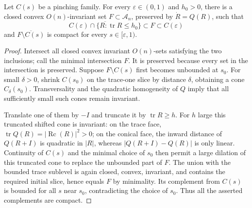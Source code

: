 \begin{theorem}
  \label{thm:chow-ii-generalized-pinching-set}
  Let \(C(s)\) be a pinching family.  For every \(\varepsilon\in(0,1)\) and
  \(h_0>0\), there is a closed convex \(O(n)\)-invariant set
  \(F\subset\mathcal A_n\), preserved by \(\dot R=Q(R)\), such that
  \[
  \overline{C(\varepsilon)\cap\{R:\operatorname{tr}R\le h_0\}}
  \subset F\subset C(\varepsilon)
  \]
  and \(\overline{F\setminus C(s)}\) is compact for every
  \(s\in[\varepsilon,1)\).
\end{theorem}
\begin{proof}
\sketch
  Intersect all closed convex invariant \(O(n)\)-sets satisfying the two
  inclusions; call the minimal intersection \(F\).  It is preserved because
  every set in the intersection is preserved.  Suppose
  \(F\setminus C(s)\) first becomes unbounded at \(s_0\).  For small
  \(\delta>0\), shrink \(C(s_0)\) on the trace-one slice by distance
  \(\delta\), obtaining a cone \(C_\delta(s_0)\).  Transversality and the
  quadratic homogeneity of \(Q\) imply that all sufficiently small such
  cones remain invariant.

  Translate one of them by \(-I\) and truncate it by
  \(\operatorname{tr}R\ge h\).  For \(h\) large this truncated shifted cone is
  invariant: on the trace face,
  \(\operatorname{tr}Q(R)=|\operatorname{Rc}(R)|^2>0\); on the conical face,
  the inward distance of \(Q(R+I)\) is quadratic in \(|R|\), whereas
  \(|Q(R+I)-Q(R)|\) is only linear.  Continuity of \(C(s)\) and the minimal
  choice of \(s_0\) then permit a large dilation of this truncated cone to
  replace the unbounded part of \(F\).  The union with the bounded trace
  sublevel is again closed, convex, invariant, and contains the required
  initial slice, hence equals \(F\) by minimality.  Its complement from
  \(C(s)\) is bounded for all \(s\) near \(s_0\), contradicting the choice of
  \(s_0\).  Thus all the asserted complements are compact.
\end{proof}

